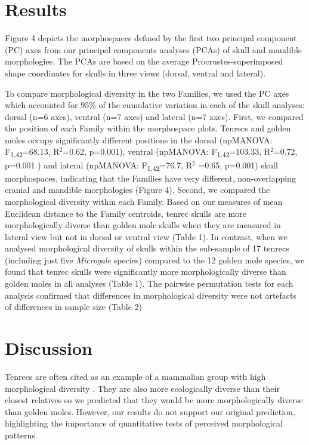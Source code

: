 \documentclass[12pt,a4paper]{article}
\begin{document}
\section{Results} 
	Figure 4 depicts the morphospaces defined by the first two principal component (PC) axes from our principal components analyses (PCAs) of skull and mandible morphologies. The PCAs are based on the average Procrustes-superimposed shape coordinates for skulls in three views (dorsal, ventral and lateral).

	To compare morphological diversity in the two Families, we used the PC axes which accounted for 95\% of the cumulative variation in each of the skull analyses: dorsal (n=6 axes), ventral (n=7 axes) and lateral (n=7 axes). First, we compared the position of each Family within the morphospace plots. Tenrecs and golden moles occupy significantly different positions in the dorsal (npMANOVA: F\textsubscript{1,42}=68.13, R$^2$=0.62, p=0.001), ventral (npMANOVA: F\textsubscript{1,42}=103.33, R$^2$=0.72, p=0.001 ) and lateral (npMANOVA: F\textsubscript{1,42}=76.7, R$^2$ =0.65, p=0.001) skull morphospaces, indicating that the Families have very different, non-overlapping cranial and mandible morphologies (Figure 4). 
	Second, we compared the morphological diversity within each Family. Based on our measures of mean Euclidean distance to the Family centroids, tenrec skulls are more morphologically diverse than golden mole skulls when they are measured in lateral view but not in dorsal or ventral view (Table 1). In contrast, when we analysed morphological diversity of skulls within the sub-sample of 17 tenrecs (including just five \textit{Microgale} species) compared to the 12 golden mole species, we found that tenrec skulls were significantly more morphologically diverse than golden moles in all analyses (Table 1). The pairwise permutation tests for each analysis confirmed that differences in morphological diversity were not artefacts of differences in sample size (Table 2)

\section{Discussion}

	Tenrecs are often cited as an example of a mammalian group with high morphological diversity \citep{Olson2013, Soarimalala2011, Eisenberg1969}. They are also more ecologically diverse than their closest relatives \citep{Soarimalala2011, Bronner1995} so we predicted that they would be more morphologically diverse than golden moles. However, our results do not support our original prediction, highlighting the importance of quantitative tests of perceived morphological patterns.
\end{document}

